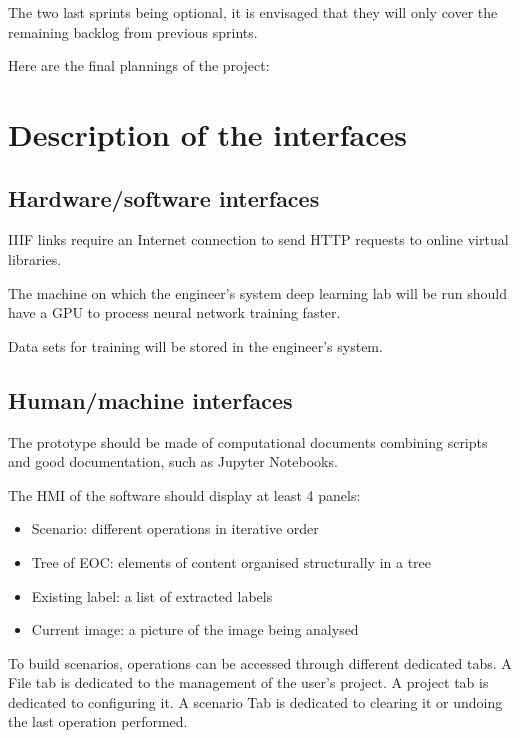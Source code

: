 \documentclass{polytech/polytech}
\numberwithin{figure}{chapter}
\begin{document}
\begin{appendix}
The two last sprints being optional, it is envisaged that they will only cover the remaining backlog from previous sprints.


Here are the final plannings of the project:
\label{planS102}
\label{planS102}


\chapter{Description of the interfaces}

\section{Hardware/software interfaces}

IIIF links require an Internet connection to send HTTP requests to online virtual libraries.

The machine on which the engineer's system deep learning lab will be run should have a GPU to process neural network training faster.

Data sets for training will be stored in the engineer's system.


\section{Human/machine interfaces}

The prototype should be made of computational documents combining scripts and good documentation, such as Jupyter Notebooks.

The HMI of the software should display at least 4 panels:
\begin{itemize}
\item Scenario: different operations in iterative order
\item Tree of EOC: elements of content organised structurally in a tree
\item Existing label: a list of extracted labels
\item Current image: a picture of the image being analysed
\end{itemize}

To build scenarios, operations can be accessed through different dedicated tabs.
A File tab is dedicated to the management of the user's project.
A project tab is dedicated to configuring it.
A scenario Tab is dedicated to clearing it or undoing the last operation performed.


\end{appendix}
\end{document}
